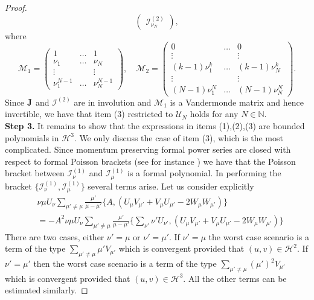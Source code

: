 \documentclass[reqno,11pt]{amsart}
\theoremstyle{plain}
\numberwithin{equation}{section}
\newcommand{\N}{\mathbb{N}}
\newcommand{\M}{\mathcal{M}}
\renewcommand{\H}{\mathcal{H}}
\newcommand{\I}{{\texttt{\bf J}}}
\newcommand{\cI}{{\mathcal I}}
\begin{document}
{\begin{proof}
\begin{equation}
\begin{pmatrix}
		\cI^{(2)}_{\nu_N}
	\end{pmatrix},
\end{equation}
where
\begin{equation}
	\M_1=\begin{pmatrix}
		1&\ldots&1\\
		\nu_1&\ldots&\nu_N\\
		\vdots&&\vdots\\
		\nu_1^{N-1}&\ldots&\nu_N^{N-1}
	\end{pmatrix},\quad \M_2=\begin{pmatrix}
		0&\ldots&0\\
		\vdots&&\vdots\\
		(k-1)\nu_1^k&\ldots&(k-1)\nu_N^k\\
		\vdots&&\vdots\\
		(N-1)\nu_1^N&\ldots&(N-1)\nu_N^N
	\end{pmatrix}.
\end{equation}
Since $\I$ and $\cI^{(2)}$ are in involution and $\M_1$ is a Vandermonde matrix and hence invertible,  we have that item (3) restricted to $\mathscr{U}_N$ holds for any $N\in\N$.\\

{\bf Step 3.}  It remains to show that the expressions in items (1),(2),(3) are bounded polynomials in $\H^3$. We only discuss the case of item (3), which is the most complicated.
 Since momentum preserving formal power series are closed with respect to formal Poisson brackets (see for instance \cite{ProcesiStolo}) we have that the Poisson bracket between $\cI^{(1)}_\nu$ and $\cI^{(1)}_\mu$ is a formal polynomial.
 In performing the bracket $\{\cI_\nu^{(1)}, \cI_\mu^{(1)}\} $  several terms arise. Let us consider explicitly
 \[
\begin{aligned}
	&\nu\mu  U_\nu  \sum_{\mu' \ne \mu}  \frac{\mu'}{\mu - \mu'} \{	A ,( U_\mu V_{\mu'} + V_\mu U_{\mu'} - 2 W_\mu W_{\mu'}) \}
\\
&= -A^2 \nu\mu  U_\nu  \sum_{\mu' \ne \mu}  \frac{\mu'}{\mu - \mu'} \{	\sum_{\nu'} \nu' U_{\nu'} ,( U_\mu V_{\mu'} + V_\mu U_{\mu'} - 2 W_\mu W_{\mu'}) \}
\end{aligned}
 \]
 There are two cases, either $\nu'=\mu$ or $\nu'=\mu'$.  If $\nu'=\mu$ the worst case scenario is a term of the type $\sum_{\mu' \ne \mu}\mu' V_{\mu'}$ which is convergent provided that $(u,v)\in \H^2$. If $\nu'=\mu'$ then  the worst case scenario is a term of the type $\sum_{\mu' \ne \mu}(\mu' )^2V_{\mu'}$ which is convergent provided that $(u,v)\in \H^3$.  All the other terms can be estimated similarly.
 

\end{proof}}
\end{document}
